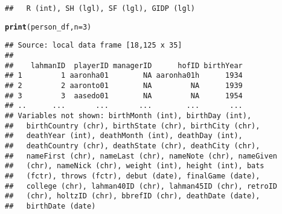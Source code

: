 \documentclass{beamer}\usepackage[]{graphicx}\usepackage[]{color}
\makeatletter
\newcommand{\hlnum}[1]{\textcolor[rgb]{0.686,0.059,0.569}{#1}}%
\newcommand{\hlstd}[1]{\textcolor[rgb]{0.345,0.345,0.345}{#1}}%
\newcommand{\hlkwc}[1]{\textcolor[rgb]{0.333,0.667,0.333}{#1}}%
\newcommand{\hlkwd}[1]{\textcolor[rgb]{0.737,0.353,0.396}{\textbf{#1}}}%
\newenvironment{kframe}{%
 \def\at@end@of@kframe{}%
 \ifinner\ifhmode%
  \def\at@end@of@kframe{\end{minipage}}%
  \begin{minipage}{\columnwidth}%
 \fi\fi%
 \def\FrameCommand##1{\hskip\@totalleftmargin \hskip-\fboxsep
 \colorbox{shadecolor}{##1}\hskip-\fboxsep
     \hskip-\linewidth \hskip-\@totalleftmargin \hskip\columnwidth}%
 \MakeFramed {\advance\hsize-\width
   \@totalleftmargin\z@ \linewidth\hsize
   \@setminipage}}%
 {\par\unskip\endMakeFramed%
 \at@end@of@kframe}
\newenvironment{knitrout}{}{} %
\makeatother
\begin{document}
\begin{frame}[fragile]
\begin{knitrout}
\begin{kframe}
\begin{verbatim}
##   R (int), SH (lgl), SF (lgl), GIDP (lgl)
\end{verbatim}
\begin{alltt}
\hlkwd{print}\hlstd{(person_df,}   \hlkwc{n} \hlstd{=} \hlnum{3}\hlstd{)}
\end{alltt}
\begin{verbatim}
## Source: local data frame [18,125 x 35]
## 
##    lahmanID  playerID managerID      hofID birthYear
## 1         1 aaronha01        NA aaronha01h      1934
## 2         2 aaronto01        NA         NA      1939
## 3         3  aasedo01        NA         NA      1954
## ..      ...       ...       ...        ...       ...
## Variables not shown: birthMonth (int), birthDay (int),
##   birthCountry (chr), birthState (chr), birthCity (chr),
##   deathYear (int), deathMonth (int), deathDay (int),
##   deathCountry (chr), deathState (chr), deathCity (chr),
##   nameFirst (chr), nameLast (chr), nameNote (chr), nameGiven
##   (chr), nameNick (chr), weight (int), height (int), bats
##   (fctr), throws (fctr), debut (date), finalGame (date),
##   college (chr), lahman40ID (chr), lahman45ID (chr), retroID
##   (chr), holtzID (chr), bbrefID (chr), deathDate (date),
##   birthDate (date)
\end{verbatim}
\end{kframe}
\end{knitrout}
\end{frame} 
\end{document}
